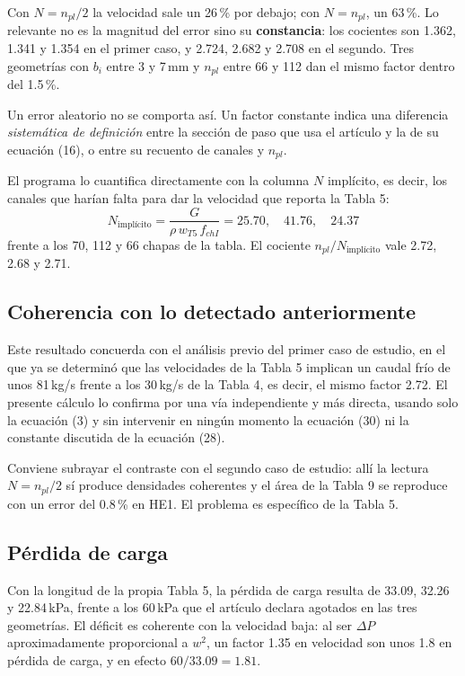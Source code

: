 \documentclass[11pt,a4paper]{article}
\begin{document}
Con $N = n_{pl}/2$ la velocidad sale un 26\,\% por debajo; con $N = n_{pl}$, un 63\,\%. Lo
relevante no es la magnitud del error sino su \textbf{constancia}: los cocientes son 1.362,
1.341 y 1.354 en el primer caso, y 2.724, 2.682 y 2.708 en el segundo. Tres geometrías con
$b_i$ entre 3 y 7\,mm y $n_{pl}$ entre 66 y 112 dan el mismo factor dentro del 1.5\,\%.

Un error aleatorio no se comporta así. Un factor constante indica una diferencia
\emph{sistemática de definición} entre la sección de paso que usa el artículo y la de su
ecuación (16), o entre su recuento de canales y $n_{pl}$.

El programa lo cuantifica directamente con la columna $N$ implícito, es decir, los canales que
harían falta para dar la velocidad que reporta la Tabla 5:
\begin{equation}
  N_{\text{implícito}} = \frac{G}{\rho\,w_{T5}\,f_{chI}}
  = 25.70,\quad 41.76,\quad 24.37
\end{equation}
frente a los 70, 112 y 66 chapas de la tabla. El cociente $n_{pl}/N_{\text{implícito}}$ vale
2.72, 2.68 y 2.71.

\subsection{Coherencia con lo detectado anteriormente}

Este resultado concuerda con el análisis previo del primer caso de estudio, en el que ya se
determinó que las velocidades de la Tabla 5 implican un caudal frío de unos 81\,kg/s frente a
los 30\,kg/s de la Tabla 4, es decir, el mismo factor 2.72. El presente cálculo lo confirma por
una vía independiente y más directa, usando solo la ecuación (3) y sin intervenir en ningún
momento la ecuación (30) ni la constante discutida de la ecuación (28).

Conviene subrayar el contraste con el segundo caso de estudio: allí la lectura
$N = n_{pl}/2$ sí produce densidades coherentes y el área de la Tabla 9 se reproduce con un
error del 0.8\,\% en HE1. El problema es específico de la Tabla 5.

\subsection{Pérdida de carga}

Con la longitud de la propia Tabla 5, la pérdida de carga resulta de 33.09, 32.26 y
22.84\,kPa, frente a los 60\,kPa que el artículo declara agotados en las tres geometrías. El
déficit es coherente con la velocidad baja: al ser $\Delta P$ aproximadamente proporcional a
$w^2$, un factor 1.35 en velocidad son unos 1.8 en pérdida de carga, y en efecto
$60/33.09 = 1.81$.
\end{document}
